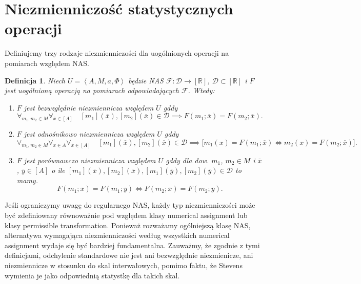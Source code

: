 \documentclass[12pt,a4paper]{report}
\newtheorem{definition}{Definicja}[chapter]
\newcommand{\domkniecie}[1]{\left\lbrack{#1}\right\rbrack}
\newcommand{\tuple}[1]{\left\langle {#1} \right\rangle}
\begin{document}
\section{Niezmienniczość statystycznych operacji}
Definiujemy trzy rodzaje niezmienniczości dla uogólnionych operacji na pomiarach względem NAS. 
\begin{definition}
Niech $U=\tuple{A,M,a,\Phi}$ będzie NAS $\mathcal{F}:\mathcal{D}\to\domkniecie{\mathbb{R}}$, $\mathcal{D}\subset \domkniecie{\mathbb{R}}$ i $F$ jest uogólnioną operacją na pomiarach odpowiadających $\mathcal{F}$. Wtedy:
\begin{enumerate}
\item
$F$ jest bezwzględnie niezmiennicza względem $U$ gddy
$$
\forall_{m_{1}, m_{2} \in M}  \forall_{\overline{x} \in \domkniecie{A}} \quad \domkniecie{m_1}(\overline{x}), \domkniecie{m_2}(\overline{x})\in \mathcal{D} \implies F(m_{1};\overline{x})=F(m_{2};\overline{x}).
$$
\item
$F$ jest odnośnikowo niezmiennicza względem $U$ gddy 
$$
\forall_{m_{1}, m_{2} \in M} \forall_{x \in A} \forall_{\overline{x} \in \domkniecie{A}} \quad \domkniecie{m_1}(\overline{x}),\domkniecie{m_2}(\overline{x})\in \mathcal{D} \implies \big[ m_{1}(x)=F(m_{1};\overline{x}) \iff m_{2}(x)=F(m_{2};\overline{x}) \big].
$$
\item
$F$ jest porównawczo niezmiennicza względem $U$ gddy dla dow. $m_1$, $m_2 \in M$ i $\overline{x}$, $\overline{y} \in \domkniecie{A}$ o ile $\domkniecie{m_1}(\overline{x}), \domkniecie{ m_2}(\overline{x}), \domkniecie{m_1}(\overline{y}), \domkniecie{m_2}(\overline{y}) \in \mathcal{D}$ to mamy.
$$
F(m_{1};\overline{x})=F(m_{1};\overline{y}) \iff F(m_{2};\overline{x})=F(m_{2};\overline{y}).
$$
\end{enumerate} 
\end{definition}

Jeśli ograniczymy uwagę do regularnego NAS, każdy typ niezmienniczości może być zdefiniowany równoważnie pod względem klasy numerical assignment lub klasy permissible transformation. Ponieważ rozważamy ogólniejszą klasę NAS, alternatywa wymagająca niezmienniczości według wszystkich numerical assignment wydaje się być bardziej fundamentalna. Zauważmy, że zgodnie z tymi definicjami, odchylenie standardowe nie jest ani bezwzględnie niezmienicze, ani niezmiennicze w stosunku do skal interwałowych, pomimo faktu, że Stevens wymienia je jako odpowiednią statystkę dla takich skal.
\end{document}
